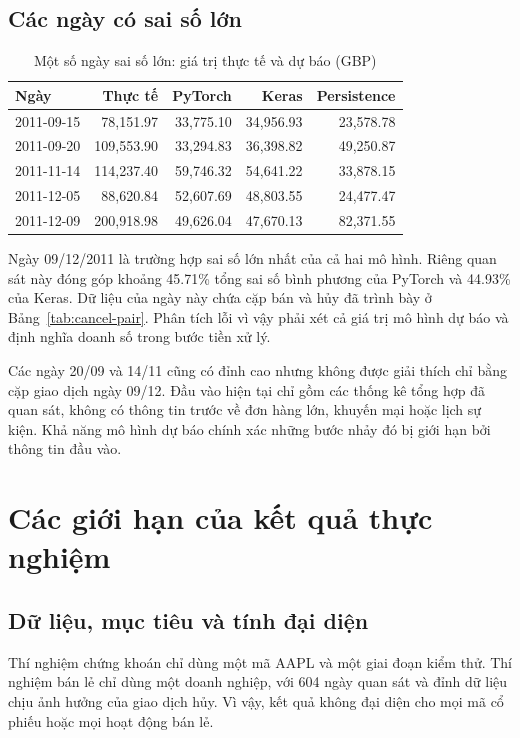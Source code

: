 \documentclass[12pt,a4paper]{report}
\begin{document}
\subsection{Các ngày có sai số lớn}
\begin{table}[H]\centering\small
\setlength{\tabcolsep}{4pt}
\caption{Một số ngày sai số lớn: giá trị thực tế và dự báo (GBP)}\label{tab:retail-errors}
\begin{tabular}{@{}lrrrr@{}}\toprule
Ngày & Thực tế & PyTorch & Keras & Persistence \\\midrule
2011-09-15 & 78,151.97 & 33,775.10 & 34,956.93 & 23,578.78 \\
2011-09-20 & 109,553.90 & 33,294.83 & 36,398.82 & 49,250.87 \\
2011-11-14 & 114,237.40 & 59,746.32 & 54,641.22 & 33,878.15 \\
2011-12-05 & 88,620.84 & 52,607.69 & 48,803.55 & 24,477.47 \\
2011-12-09 & 200,918.98 & 49,626.04 & 47,670.13 & 82,371.55 \\
\bottomrule\end{tabular}
\end{table}

Ngày 09/12/2011 là trường hợp sai số lớn nhất của cả hai mô hình. Riêng quan sát này đóng góp khoảng 45.71\% tổng sai số bình phương của PyTorch và 44.93\% của Keras. Dữ liệu của ngày này chứa cặp bán và hủy đã trình bày ở Bảng~\ref{tab:cancel-pair}. Phân tích lỗi vì vậy phải xét cả giá trị mô hình dự báo và định nghĩa doanh số trong bước tiền xử lý.

Các ngày 20/09 và 14/11 cũng có đỉnh cao nhưng không được giải thích chỉ bằng cặp giao dịch ngày 09/12. Đầu vào hiện tại chỉ gồm các thống kê tổng hợp đã quan sát, không có thông tin trước về đơn hàng lớn, khuyến mại hoặc lịch sự kiện. Khả năng mô hình dự báo chính xác những bước nhảy đó bị giới hạn bởi thông tin đầu vào.

\section{Các giới hạn của kết quả thực nghiệm}
\subsection{Dữ liệu, mục tiêu và tính đại diện}
Thí nghiệm chứng khoán chỉ dùng một mã AAPL và một giai đoạn kiểm thử. Thí nghiệm bán lẻ chỉ dùng một doanh nghiệp, với 604 ngày quan sát và đỉnh dữ liệu chịu ảnh hưởng của giao dịch hủy. Vì vậy, kết quả không đại diện cho mọi mã cổ phiếu hoặc mọi hoạt động bán lẻ.
\end{document}
